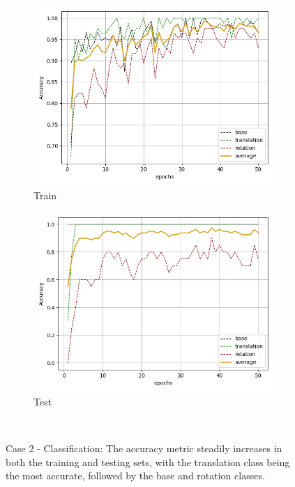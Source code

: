 \begin{figure}[H]
    \begin{subfigure}{.48\linewidth}
    \centering
    \includegraphics[scale=0.45]{Img/cls_noise_train_acc.png}
    \caption{Train}
    \end{subfigure}
    \begin{subfigure}{.48\linewidth}
    \centering
    \includegraphics[scale=0.45]{Img/cls_noise_test_acc.png}
    \caption{Test}
    \end{subfigure}\\
    \caption{Case 2 - Classification: The accuracy metric steadily increases in both the training and testing sets, with the translation class being the most accurate, followed by the base and rotation classes.}
    \label{fig:cls_noise_acc}
\end{figure}
